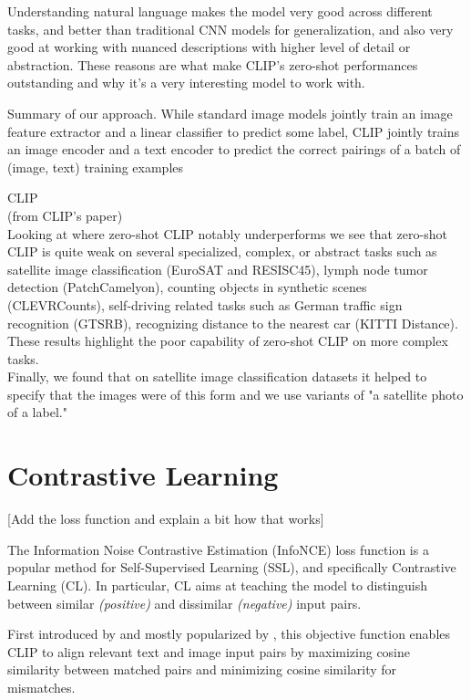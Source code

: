 \documentclass[a4paper, oneside, english]{sapthesis}
\begin{document}
Understanding natural language makes the model very good across different tasks, and better than traditional CNN models for generalization, and also very good at working with nuanced descriptions with higher level of detail or abstraction. These reasons are what make CLIP's zero-shot performances outstanding and why it's a very interesting model to work with.



Summary of our approach. While standard image models jointly train an image feature extractor and a linear classifier to predict
some label, CLIP jointly trains an image encoder and a text encoder to predict the correct pairings of a batch of (image, text) training
examples


CLIP \cite{radford2021learning} \\

(from CLIP's paper) \\

Looking at where zero-shot CLIP notably underperforms we see that zero-shot CLIP is quite weak on several specialized, complex, or abstract tasks such as satellite image classification (EuroSAT and RESISC45), lymph node tumor detection (PatchCamelyon), counting objects in synthetic
scenes (CLEVRCounts), self-driving related tasks such as German traffic sign recognition (GTSRB), recognizing distance to the nearest car (KITTI Distance). These results highlight the poor capability of zero-shot CLIP on more complex tasks. \\

Finally, we found that on satellite image classification datasets it helped to specify that the images were of
this form and we use variants of "a satellite photo
of a {label}."




\section{Contrastive Learning}

[Add the loss function and explain a bit how that works]

The Information Noise Contrastive Estimation (InfoNCE) loss function is a popular method for Self-Supervised Learning (SSL), and specifically Contrastive Learning (CL). In particular, CL aims at teaching the model to distinguish between similar \emph{(positive)} and dissimilar \emph{(negative)} input pairs. 


First introduced by \cite{sohn2016improved} and mostly popularized by \cite{oord2018representation}, this objective function enables CLIP to align relevant text and image input pairs by maximizing cosine similarity between matched pairs and minimizing cosine similarity for mismatches.
\end{document}
